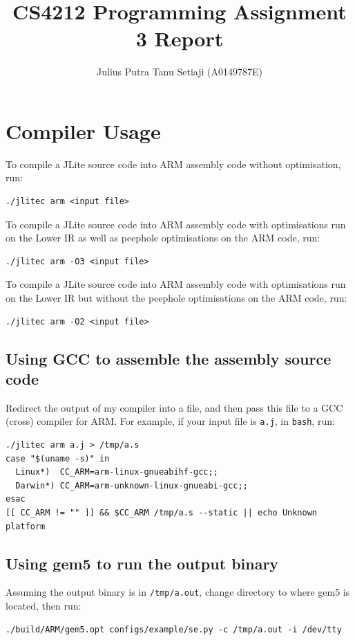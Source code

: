 \documentclass[nonacm, acmsmall, screen, 10pt]{acmart}
\begin{document}
\title{CS4212 Programming Assignment 3 Report}
\author{Julius Putra Tanu Setiaji (A0149787E)}\makeatletter\let\@authorsaddresses\@empty\makeatother%
\maketitle
\tableofcontents

\section{Compiler Usage}
To compile a JLite source code into ARM assembly code without optimisation, run:
\begin{verbatim}
./jlitec arm <input file>
\end{verbatim}

To compile a JLite source code into ARM assembly code with optimisations run on the Lower IR as well as peephole optimisations on the ARM code, run:
\begin{verbatim}
./jlitec arm -O3 <input file>
\end{verbatim}

To compile a JLite source code into ARM assembly code with optimisations run on the Lower IR but without the peephole optimisations on the ARM code, run:
\begin{verbatim}
./jlitec arm -O2 <input file>
\end{verbatim}

\subsection{Using GCC to assemble the assembly source code}
Redirect the output of my compiler into a file, and then pass this file to a GCC (cross) compiler for ARM.
For example, if your input file is \texttt{a.j}, in \texttt{bash}, run:
\begin{verbatim}
./jlitec arm a.j > /tmp/a.s
case "$(uname -s)" in
  Linux*)  CC_ARM=arm-linux-gnueabihf-gcc;;
  Darwin*) CC_ARM=arm-unknown-linux-gnueabi-gcc;;
esac
[[ CC_ARM != "" ]] && $CC_ARM /tmp/a.s --static || echo Unknown platform
\end{verbatim}

\subsection{Using gem5 to run the output binary}
Assuming the output binary is in \texttt{/tmp/a.out}, change directory to where gem5 is located, then run:
\begin{verbatim}
./build/ARM/gem5.opt configs/example/se.py -c /tmp/a.out -i /dev/tty
\end{verbatim}
\end{document}
